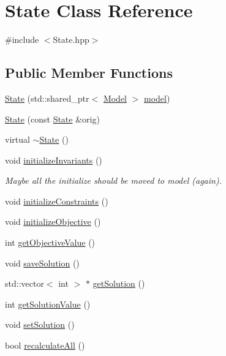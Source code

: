 \hypertarget{class_state}{\section{State Class Reference}
\label{class_state}
}


{\ttfamily \#include $<$State.\-hpp$>$}

\subsection*{Public Member Functions}
\begin{DoxyCompactItemize}
\item 
\hyperlink{class_state_a96b1ea641bbd8a6f6307e8746b8e661e}{State} (std\-::shared\-\_\-ptr$<$ \hyperlink{class_model}{Model} $>$ \hyperlink{class_state_a186c5e2023a2fe5f0587c77e55f122a9}{model})
\item 
\hyperlink{class_state_ae26524535e8d9942d3e6c366034871b2}{State} (const \hyperlink{class_state}{State} \&orig)
\item 
virtual \hyperlink{class_state_afab438d92b90dc18d194dbd9c9c8bab3}{$\sim$\-State} ()
\item 
void \hyperlink{class_state_aa0dbbbff73846072ab4a395ab376eeb7}{initialize\-Invariants} ()
\begin{DoxyCompactList}\small\item\em Maybe all the initialize should be moved to model (again). \end{DoxyCompactList}\item 
void \hyperlink{class_state_a75fc5012815b887e31dc9c5e62520fd4}{initialize\-Constraints} ()
\item 
void \hyperlink{class_state_aa1af926682cee09f6074833856adba10}{initialize\-Objective} ()
\item 
int \hyperlink{class_state_a1deb2567ba6e2e1bf292658db671b5bd}{get\-Objective\-Value} ()
\item 
void \hyperlink{class_state_a73295654a3879aa1651543156d4cad9e}{save\-Solution} ()
\item 
std\-::vector$<$ int $>$ $\ast$ \hyperlink{class_state_a51ba8c2241ed349b83e5e46f30c0a0ba}{get\-Solution} ()
\item 
int \hyperlink{class_state_aa75ca0e6a38f66db9365e32c035d992e}{get\-Solution\-Value} ()
\item 
void \hyperlink{class_state_a9d4048063f30a838bf430ffb7ecdfbc7}{set\-Solution} ()
\item 
bool \hyperlink{class_state_a7efd4a9d3bb0a2d285421e7cf847e826}{recalculate\-All} ()

\end{DoxyCompactItemize}
